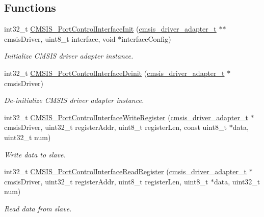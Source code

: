 \subsection*{Functions}
\begin{DoxyCompactItemize}
\item 
int32\-\_\-t \hyperlink{group__usb__pd__cmsis__wrapper_ga4140e0b4e54efdabe981bdfbc97725dd}{C\-M\-S\-I\-S\-\_\-\-Port\-Control\-Interface\-Init} (\hyperlink{group__usb__pd__cmsis__wrapper_ga53daa69dcc6fde0029cec3452c8b58ff}{cmsis\-\_\-driver\-\_\-adapter\-\_\-t} $\ast$$\ast$cmsis\-Driver, uint8\-\_\-t interface, void $\ast$interface\-Config)
\begin{DoxyCompactList}\small\item\em Initialize C\-M\-S\-I\-S driver adapter instance. \end{DoxyCompactList}\item 
int32\-\_\-t \hyperlink{group__usb__pd__cmsis__wrapper_ga5ae4fe326851bb5374399212012e22f9}{C\-M\-S\-I\-S\-\_\-\-Port\-Control\-Interface\-Deinit} (\hyperlink{group__usb__pd__cmsis__wrapper_ga53daa69dcc6fde0029cec3452c8b58ff}{cmsis\-\_\-driver\-\_\-adapter\-\_\-t} $\ast$cmsis\-Driver)
\begin{DoxyCompactList}\small\item\em De-\/initialize C\-M\-S\-I\-S driver adapter instance. \end{DoxyCompactList}\item 
int32\-\_\-t \hyperlink{group__usb__pd__cmsis__wrapper_ga09c1e56830b347c846c280fe3525c757}{C\-M\-S\-I\-S\-\_\-\-Port\-Control\-Interface\-Write\-Register} (\hyperlink{group__usb__pd__cmsis__wrapper_ga53daa69dcc6fde0029cec3452c8b58ff}{cmsis\-\_\-driver\-\_\-adapter\-\_\-t} $\ast$cmsis\-Driver, uint32\-\_\-t register\-Addr, uint8\-\_\-t register\-Len, const uint8\-\_\-t $\ast$data, uint32\-\_\-t num)
\begin{DoxyCompactList}\small\item\em Write data to slave. \end{DoxyCompactList}\item 
int32\-\_\-t \hyperlink{group__usb__pd__cmsis__wrapper_ga190a521ef01279662f71d4e33e51aa4c}{C\-M\-S\-I\-S\-\_\-\-Port\-Control\-Interface\-Read\-Register} (\hyperlink{group__usb__pd__cmsis__wrapper_ga53daa69dcc6fde0029cec3452c8b58ff}{cmsis\-\_\-driver\-\_\-adapter\-\_\-t} $\ast$cmsis\-Driver, uint32\-\_\-t register\-Addr, uint8\-\_\-t register\-Len, uint8\-\_\-t $\ast$data, uint32\-\_\-t num)
\begin{DoxyCompactList}\small\item\em Read data from slave. \end{DoxyCompactList}\end{DoxyCompactItemize}


